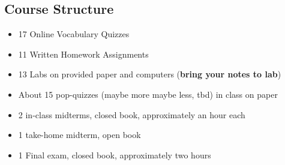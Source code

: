 \documentclass[12pt]{article}
\theoremstyle{nonumberplain}
\begin{document}
\newpage

\subsection*{Course Structure}

\begin{itemize}
\item 17 Online Vocabulary Quizzes
\item 11 Written Homework Assignments 
\item 13 Labs on provided paper and computers (\textbf{bring your notes to lab})
\item About 15 pop-quizzes (maybe more maybe less, tbd) in class on paper
\item 2 in-class midterms, closed book, approximately an hour each
\item 1 take-home midterm, open book
\item 1 Final exam, closed book, approximately two hours
\end{itemize}
\end{document}
